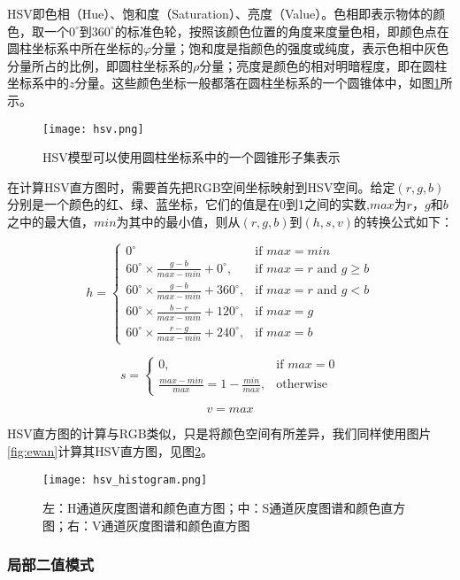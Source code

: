   HSV即色相（Hue）、饱和度（Saturation）、亮度（Value）。色相即表示物体的颜色，取一个$0^{\circ}$到$360^{\circ}$的标准色轮，按照该颜色位置的角度来度量色相，即颜色点在圆柱坐标系中所在坐标的$\varphi$分量；饱和度是指颜色的强度或纯度，表示色相中灰色分量所占的比例，即圆柱坐标系的$\rho$分量；亮度是颜色的相对明暗程度，即在圆柱坐标系中的$z$分量。这些颜色坐标一般都落在圆柱坐标系的一个圆锥体中，如图\ref{fig:hsv}所示。

\begin{figure}[htb]
  \centering
  \texttt{[image: hsv.png]}
  \caption{HSV模型可以使用圆柱坐标系中的一个圆锥形子集表示}
  \label{fig:hsv}
\end{figure}

  在计算HSV直方图时，需要首先把RGB空间坐标映射到HSV空间。给定$(r,g,b)$分别是一个颜色的红、绿、蓝坐标，它们的值是在0到1之间的实数,$max$为$r$，$g$和$b$之中的最大值，$min$为其中的最小值，则从$(r,g,b)$到$(h,s,v)$的转换公式如下：\cite{foley1982fundamentals}

$$h={\begin{cases}0^{\circ }&{\mbox{if }}max=min\\60^{\circ }\times {\frac  {g-b}{max-min}}+0^{\circ },&{\mbox{if }}max=r{\mbox{ and }}g\geq b\\60^{\circ }\times {\frac  {g-b}{max-min}}+360^{\circ },&{\mbox{if }}max=r{\mbox{ and }}g<b\\60^{\circ }\times {\frac  {b-r}{max-min}}+120^{\circ },&{\mbox{if }}max=g\\60^{\circ }\times {\frac  {r-g}{max-min}}+240^{\circ },&{\mbox{if }}max=b\end{cases}}$$

$$s={\begin{cases}0,&{\mbox{if }}max=0\\{\frac  {max-min}{max}}=1-{\frac  {min}{max}},&{\mbox{otherwise}}\end{cases}}$$

$$
v=max
$$

  HSV直方图的计算与RGB类似，只是将颜色空间有所差异，我们同样使用图片\ref{fig:ewan}计算其HSV直方图，见图\ref{fig:hsvhistogram}。

\begin{figure}[htb]
  \centering
  \texttt{[image: hsv\_histogram.png]}
  \caption{左：H通道灰度图谱和颜色直方图；中：S通道灰度图谱和颜色直方图；右：V通道灰度图谱和颜色直方图}
  \label{fig:hsvhistogram}
\end{figure}

\subsubsection{局部二值模式}

